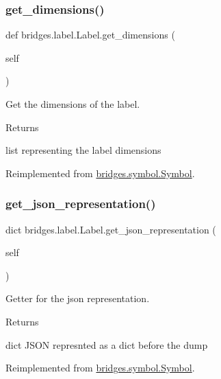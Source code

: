 \subsubsection{\texorpdfstring{get\_dimensions()}{get\_dimensions()}}
{\footnotesize\ttfamily def bridges.\+label.\+Label.\+get\+\_\+dimensions (\begin{DoxyParamCaption}\item[{}]{self }\end{DoxyParamCaption})}



Get the dimensions of the label. 

\begin{DoxyReturn}{Returns}


list representing the label dimensions 
\end{DoxyReturn}


Reimplemented from \mbox{\hyperlink{classbridges_1_1symbol_1_1_symbol_a18aa1240a141ec2621322e37471eae30}{bridges.\+symbol.\+Symbol}}.

\mbox{\label{classbridges_1_1label_1_1_label_a71d085a24859764dbe5cf4848f74baef}} 
\subsubsection{\texorpdfstring{get\_json\_representation()}{get\_json\_representation()}}
{\footnotesize\ttfamily  dict bridges.\+label.\+Label.\+get\+\_\+json\+\_\+representation (\begin{DoxyParamCaption}\item[{}]{self }\end{DoxyParamCaption})}



Getter for the json representation. 

\begin{DoxyReturn}{Returns}


dict J\+S\+ON represnted as a dict before the dump 
\end{DoxyReturn}


Reimplemented from \mbox{\hyperlink{classbridges_1_1symbol_1_1_symbol_a891a710ff160439aa6dc476ce057f22e}{bridges.\+symbol.\+Symbol}}.

\mbox{\label{classbridges_1_1label_1_1_label_a7223de49f9e74d5c27eaf3d958c3bb30}} 
